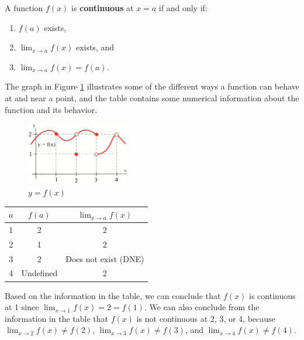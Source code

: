 \begin{definition}
A function $f(x)$ is {\bf continuous} at $x=a$ if and only if:
    \begin{enumerate}
    \item $f(a)$ exists,
    \item $\displaystyle\lim_{x\to a}f(x)$ exists, and 
    \item $\displaystyle\lim_{x\to a}f(x)=f(a)$.
    \end{enumerate}
\end{definition}
The graph in Figure \ref{fig:2-4-fx-continuity} illustrates some of the different ways a function can behave at and near a point, and the table contains some numerical information about the function and its behavior.
\begin{figure}[!ht]
  \centering
    \includegraphics[width=0.4\textwidth]{img/chap2/image015.png}
    \caption{$y=f(x)$}
    \label{fig:2-4-fx-continuity}
\end{figure}

\begin{table}[ht!]
\begin{centering}
\begin{tabular}{ccc}
\toprule
$a$	& $f(a)$ &	$\displaystyle\lim_{x\to a}f(x)$ \\		
\midrule
1 &	2 & 2	\\
2 & 1 &	2\\
3 & 2 &	Does not exist (DNE)	\\
4 & Undefined &	2\\
\bottomrule
\end{tabular}
\end{centering}
\end{table}
	
Based on the information in the table, we can conclude that $f(x)$ is continuous at 1 since $\displaystyle\lim_{x\to 1}f(x)=2=f(1)$. We can also conclude from the information in the table that $f(x)$ is not continuous at 2, 3, or 4, because $\displaystyle\lim_{x\to 2}f(x)\neq f(2)$, $\displaystyle\lim_{x\to 3} f(x)\neq f(3)$, and $\displaystyle\lim_{x\to 4} f(x)\neq f(4)$.

